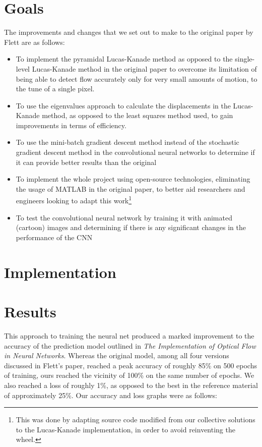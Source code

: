 \documentclass[]{article}
\begin{document}
    \section{Goals}\label{sec:goals}
    The improvements and changes that we set out to make to the original paper by Flett are as follows:

    \begin{itemize}
        \item To implement the pyramidal Lucas-Kanade method as opposed to the single-level Lucas-Kanade method in the original paper to overcome its limitation of being able to detect flow accurately only for very small amounts of motion, to the tune of a single pixel.

        \item To use the eigenvalues approach to calculate the displacements in the Lucas-Kanade method, as opposed to the least squares method used, to gain improvements in terms of efficiency.

        \item To use the mini-batch gradient descent method instead of the stochastic gradient descent method in the convolutional neural networks to determine if it can provide better results than the original

        \item To implement the whole project using open-source technologies, eliminating the usage of MATLAB in the original paper, to better aid researchers and engineers looking to adapt this work\footnote{This was done by adapting source code modified from our collective solutions to the Lucas-Kanade implementation, in order to avoid reinventing the wheel.}

        \item To test the convolutional neural network by training it with animated (cartoon) images and determining if there is any significant changes in the performance of the CNN
    \end{itemize}


    \section{Implementation}\label{sec:implementation}
    


    \section{Results}\label{sec:result}
    This approach to training the neural net produced a marked improvement to the accuracy of the prediction model outlined in \textit{The Implementation of Optical Flow in Neural Networks}.\cite{flett}
    Whereas the original model, among all four versions discussed in Flett's paper, reached a peak accuracy of roughly 85\% on 500 epochs of training, ours reached the vicinity of 100\% on the same number of epochs.
    We also reached a loss of roughly 1\%, as opposed to the best in the reference material of approximately 25\%.
    Our accuracy and loss graphs were as follows:
\end{document}
